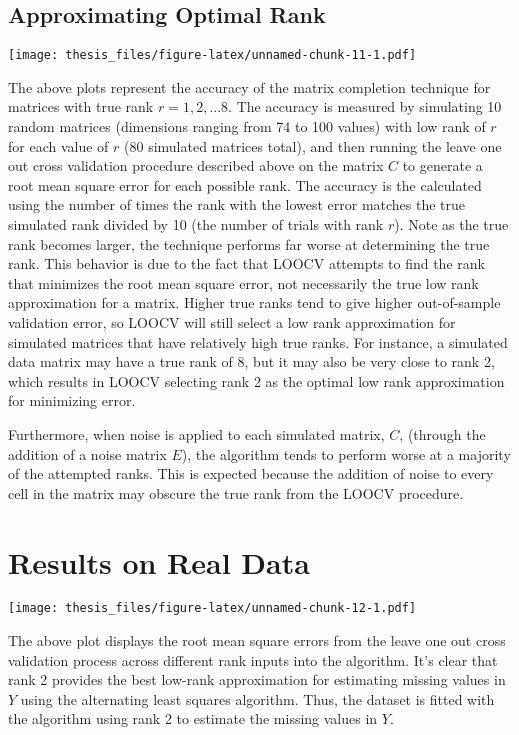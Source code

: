 \documentclass[12pt,twoside]{dukestatscithesis}
\theoremstyle{definition}
\theoremstyle{definition}
\theoremstyle{definition}
\theoremstyle{remark}
\begin{document}
\subsection{Approximating Optimal
Rank}\label{approximating-optimal-rank}

\texttt{[image: thesis\_files/figure-latex/unnamed-chunk-11-1.pdf]}

The above plots represent the accuracy of the matrix completion
technique for matrices with true rank \(r = 1,2,...8\). The accuracy is
measured by simulating 10 random matrices (dimensions ranging from 74 to
100 values) with low rank of \(r\) for each value of \(r\) (80 simulated
matrices total), and then running the leave one out cross validation
procedure described above on the matrix \(C\) to generate a root mean
square error for each possible rank. The accuracy is the calculated
using the number of times the rank with the lowest error matches the
true simulated rank divided by 10 (the number of trials with rank
\(r\)). Note as the true rank becomes larger, the technique performs far
worse at determining the true rank. This behavior is due to the fact
that LOOCV attempts to find the rank that minimizes the root mean square
error, not necessarily the true low rank approximation for a matrix.
Higher true ranks tend to give higher out-of-sample validation error, so
LOOCV will still select a low rank approximation for simulated matrices
that have relatively high true ranks. For instance, a simulated data
matrix may have a true rank of 8, but it may also be very close to rank
2, which results in LOOCV selecting rank 2 as the optimal low rank
approximation for minimizing error.

Furthermore, when noise is applied to each simulated matrix, \(C\),
(through the addition of a noise matrix \(E\)), the algorithm tends to
perform worse at a majority of the attempted ranks. This is expected
because the addition of noise to every cell in the matrix may obscure
the true rank from the LOOCV procedure.

\section{Results on Real Data}\label{results-on-real-data}

\texttt{[image: thesis\_files/figure-latex/unnamed-chunk-12-1.pdf]}

The above plot displays the root mean square errors from the leave one
out cross validation process across different rank inputs into the
algorithm. It's clear that rank 2 provides the best low-rank
approximation for estimating missing values in \(Y\) using the
alternating least squares algorithm. Thus, the dataset is fitted with
the algorithm using rank 2 to estimate the missing values in \(Y\).
\end{document}
